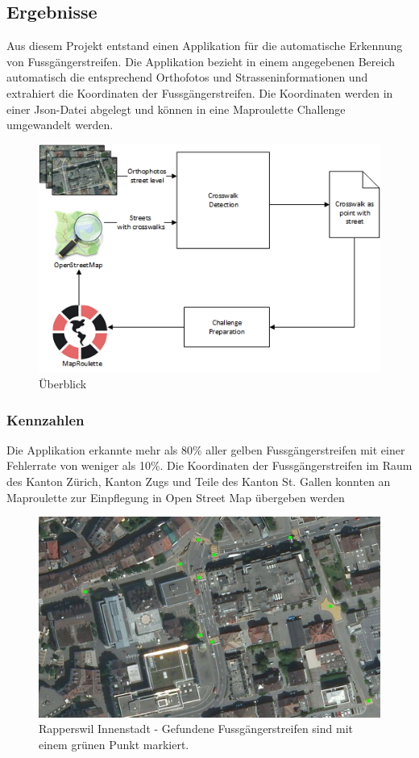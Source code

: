 \subsection*{Ergebnisse}
Aus diesem Projekt entstand einen Applikation für die automatische Erkennung von Fussgängerstreifen. Die Applikation bezieht in einem angegebenen Bereich automatisch die entsprechend Orthofotos und Strasseninformationen und extrahiert die Koordinaten der Fussgängerstreifen. Die Koordinaten werden in einer Json-Datei abgelegt und können in eine Maproulette Challenge umgewandelt werden.
\\
\begin{figure}[H]
	\centering
	\includegraphics[]{images/management_summary_1.png}
	\caption[Management Summery Überblick]{Überblick}
\end{figure}

\subsubsection{Kennzahlen}
Die Applikation erkannte mehr als 80\% aller gelben Fussgängerstreifen mit einer Fehlerrate von weniger als 10\%. Die Koordinaten der Fussgängerstreifen im Raum des Kanton Zürich, Kanton Zugs und Teile des Kanton St. Gallen konnten an Maproulette zur Einpflegung in Open Street Map übergeben werden
\\
\begin{figure}[H]
	\centering
	\includegraphics[width=\textwidth -10mm]{images/boxsave_rappi.png}
	\caption[Überblick]{Rapperswil Innenstadt - Gefundene Fussgängerstreifen sind mit einem grünen Punkt markiert.}
\end{figure}

